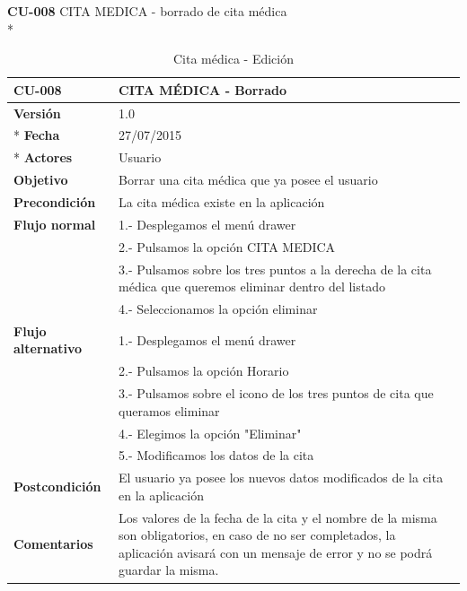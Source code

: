 \documentclass[../pfc.tex]{subfiles}
\begin{document}
	\textbf{CU-008}	CITA MEDICA - borrado de cita médica\\*
	
		\begin{table}[H]
			\centering
			\begin{tabular}[t]{|p{3cm}|p{9.5cm}|}
				\hline \textbf{CU-008} & \textbf{CITA MÉDICA - Borrado} \\*
				\hline\hline \textbf{Versión} & 1.0 \\ *
				\hline\hline \textbf{Fecha} & 27/07/2015 \\ *
				\hline\textbf{Actores} 	& Usuario\\*
				\hline \textbf{Objetivo} & Borrar una cita médica que ya posee el usuario\\* 			
				\hline \textbf{Precondición} & La cita médica existe en la aplicación\\* 
				\hline \textbf{Flujo normal} & 1.- Desplegamos el menú drawer \\* 
				& 2.- Pulsamos la opción CITA MEDICA\\*	
				& 3.- Pulsamos sobre los tres puntos a la derecha de la cita médica que queremos eliminar dentro del listado\\*	
				& 4.- Seleccionamos la opción eliminar\\*	
				\hline \textbf{Flujo alternativo} & 1.- Desplegamos el menú drawer \\* 
				& 2.- Pulsamos la opción Horario \\*	
				& 3.- Pulsamos sobre el icono de los tres puntos de cita que queramos eliminar \\*	
				& 4.- Elegimos la opción "Eliminar"\\*	
				& 5.- Modificamos los datos de la cita\\*	
				\hline \textbf{Postcondición} & El usuario ya posee los nuevos datos modificados de la cita en la aplicación \\* 
				\hline \textbf{Comentarios}   & Los valores de la fecha de la cita y el nombre de la misma son obligatorios, en caso de no ser completados, la aplicación avisará con un mensaje de error y no se podrá guardar la misma.\\*
				\hline
			\end{tabular}
			\caption{Cita médica - Edición}
			\label{tabla:caso008}

		\end{table}
		
		
		
		
	
\end{document}
